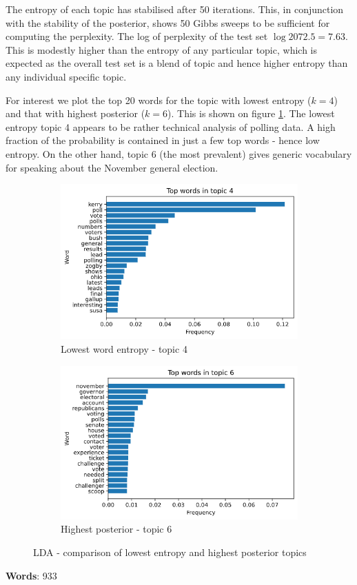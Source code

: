 \documentclass[]{article}
\begin{document}
The entropy of each topic has stabilised after 50 iterations. This, in conjunction with the stability of the posterior, shows 50 Gibbs sweeps to be sufficient for computing the perplexity. The log of perplexity of the test set $\log 2072.5 = 7.63$. This is modestly higher than the entropy of any particular topic, which is expected as the overall test set is a blend of topic and hence higher entropy than any individual specific topic.

For interest we plot the top 20 words for the topic with lowest entropy ($k=4$) and that with highest posterior ($k=6$). This is shown on figure \ref{fig:top-topics}. The lowest entropy topic 4 appears to be rather technical analysis of polling data. A high fraction of the probability is contained in just a few top words - hence low entropy. On the other hand, topic 6 (the most prevalent) gives generic vocabulary for speaking about the November general election.
%
\begin{figure}[!h]
	\begin{subfigure}{0.5\linewidth}
		\centering
		\includegraphics[width=\linewidth]{topic-4-words.png}
		\caption{Lowest word entropy - topic 4}	
	\end{subfigure}
	\begin{subfigure}{0.5\linewidth}
		\centering
		\includegraphics[width=\linewidth]{topic-6-words.png}
		\caption{Highest posterior - topic 6}
	\end{subfigure}
	\caption{LDA - comparison of lowest entropy and highest posterior topics}
	\label{fig:top-topics}
\end{figure}

\textbf{Words}: 933
\end{document}
